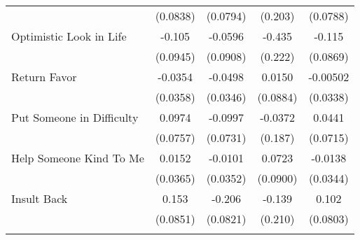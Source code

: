 {\begin{tabular}{l*{4}{c}}
            &    (0.0838)         &    (0.0794)         &     (0.203)         &    (0.0788)         \\
[1em]
Optimistic Look in Life&      -0.105         &     -0.0596         &      -0.435         &      -0.115         \\
            &    (0.0945)         &    (0.0908)         &     (0.222)         &    (0.0869)         \\
[1em]
Return Favor&     -0.0354         &     -0.0498         &      0.0150         &    -0.00502         \\
            &    (0.0358)         &    (0.0346)         &    (0.0884)         &    (0.0338)         \\
[1em]
Put Someone in Difficulty&      0.0974         &     -0.0997         &     -0.0372         &      0.0441         \\
            &    (0.0757)         &    (0.0731)         &     (0.187)         &    (0.0715)         \\
[1em]
Help Someone Kind To Me&      0.0152         &     -0.0101         &      0.0723         &     -0.0138         \\
            &    (0.0365)         &    (0.0352)         &    (0.0900)         &    (0.0344)         \\
[1em]
Insult Back &       0.153         &      -0.206\sym{*}  &      -0.139         &       0.102         \\
            &    (0.0851)         &    (0.0821)         &     (0.210)         &    (0.0803)         \\
\hline\hline
{}\\
\end{tabular}
}
